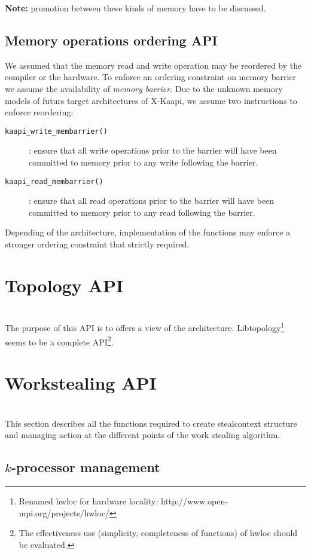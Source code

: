 \documentclass[12pt]{report}
\newcommand{\kaapi}{\textsc{X}-Kaapi}
\begin{document}
\noindent\textbf{Note:} promotion between these kinds of memory have to be discussed.\\

\subsection{Memory operations ordering API}
We assumed that the memory read and write operation may be reordered by the compiler or the hardware. To enforce an ordering constraint on memory barrier we assume the availability of \textit{memory barrier}. Due to the unknown memory models of futurs target architectures of \kaapi, we assume two instructions to enforce reordering:
\begin{description}
\item [\texttt{kaapi\_write\_membarrier()}]: ensure that all  write operations prior to the barrier will have been committed to memory prior to any write following the barrier.
\item [\texttt{kaapi\_read\_membarrier()}]: ensure that all  read operations prior to the barrier will have been committed to memory prior to any read following the barrier.
\end{description}
Depending of the architecture, implementation of the functions may enforce a stronger ordering constraint that strictly required.


\section{Topology API}
\\

The purpose of this API is to offers a view of the architecture. Libtopology\footnote{Renamed hwloc for hardware locality: http://www.open-mpi.org/projects/hwloc/} seems to be a complete API\footnote{The effectiveness use (simplicity, completeness of functions) of hwloc should be evaluated.}.

\section{Workstealing API}
\\

This section describes all the functions required to create stealcontext structure and managing action at the different points of the work stealing algorithm.


\subsection{$k$-processor management}
\end{document}
